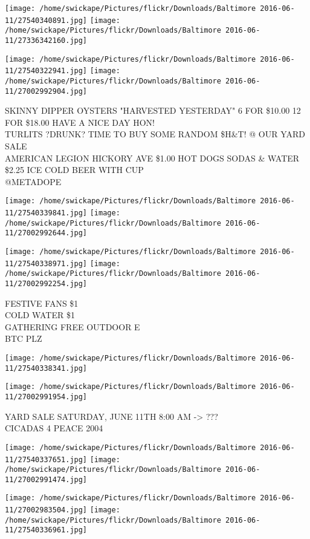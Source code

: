 \documentclass[10pt,letterpaper]{article}
\begin{document}
\texttt{[image: /home/swickape/Pictures/flickr/Downloads/Baltimore 2016-06-11/27540340891.jpg]}
\texttt{[image: /home/swickape/Pictures/flickr/Downloads/Baltimore 2016-06-11/27336342160.jpg]}

\texttt{[image: /home/swickape/Pictures/flickr/Downloads/Baltimore 2016-06-11/27540322941.jpg]}
\texttt{[image: /home/swickape/Pictures/flickr/Downloads/Baltimore 2016-06-11/27002992904.jpg]}

SKINNY DIPPER OYSTERS "HARVESTED YESTERDAY" 6 FOR \$10.00 12 FOR \$18.00 HAVE A NICE DAY HON!\\
TURLITS ?DRUNK? TIME TO BUY SOME RANDOM \$H\&T! @ OUR YARD SALE\\
AMERICAN LEGION HICKORY AVE \$1.00 HOT DOGS SODAS \& WATER \$2.25 ICE COLD BEER WITH CUP\\
@METADOPE
\pagebreak

\texttt{[image: /home/swickape/Pictures/flickr/Downloads/Baltimore 2016-06-11/27540339841.jpg]}
\texttt{[image: /home/swickape/Pictures/flickr/Downloads/Baltimore 2016-06-11/27002992644.jpg]}

\texttt{[image: /home/swickape/Pictures/flickr/Downloads/Baltimore 2016-06-11/27540338971.jpg]}
\texttt{[image: /home/swickape/Pictures/flickr/Downloads/Baltimore 2016-06-11/27002992254.jpg]}

FESTIVE FANS \$1\\
COLD WATER \$1\\
GATHERING FREE OUTDOOR E\\
BTC PLZ
\pagebreak

\texttt{[image: /home/swickape/Pictures/flickr/Downloads/Baltimore 2016-06-11/27540338341.jpg]}

\vspace{0.25in}
\texttt{[image: /home/swickape/Pictures/flickr/Downloads/Baltimore 2016-06-11/27002991954.jpg]}

YARD SALE SATURDAY, JUNE 11TH 8:00 AM {-}> ???\\
CICADAS 4 PEACE 2004
\pagebreak

\texttt{[image: /home/swickape/Pictures/flickr/Downloads/Baltimore 2016-06-11/27540337651.jpg]}
\texttt{[image: /home/swickape/Pictures/flickr/Downloads/Baltimore 2016-06-11/27002991474.jpg]}

\texttt{[image: /home/swickape/Pictures/flickr/Downloads/Baltimore 2016-06-11/27002983504.jpg]}
\texttt{[image: /home/swickape/Pictures/flickr/Downloads/Baltimore 2016-06-11/27540336961.jpg]}
\end{document}
